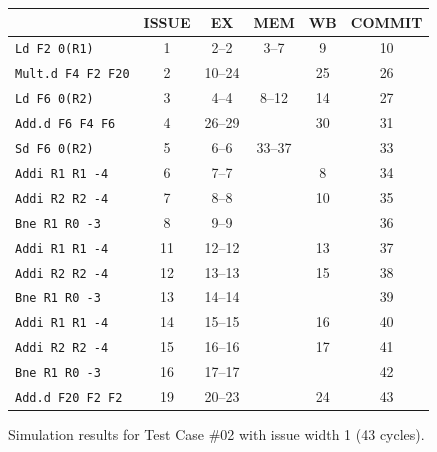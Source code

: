 \documentclass[11pt]{article}
\renewcommand{\_}{\origunderscore\allowbreak}
\begin{document}
\begin{figure}[H]
\centering
\small
\begin{tabular}{lccccc}
\hline
 & ISSUE & EX & MEM & WB & COMMIT \\
\hline
\texttt{Ld F2 0(R1)} & 1 & 2--2 & 3--7 & 9 & 10 \\
\texttt{Mult.d F4 F2 F20} & 2 & 10--24 &  & 25 & 26 \\
\texttt{Ld F6 0(R2)} & 3 & 4--4 & 8--12 & 14 & 27 \\
\texttt{Add.d F6 F4 F6} & 4 & 26--29 &  & 30 & 31 \\
\texttt{Sd F6 0(R2)} & 5 & 6--6 & 33--37 &  & 33 \\
\texttt{Addi R1 R1 -4} & 6 & 7--7 &  & 8 & 34 \\
\texttt{Addi R2 R2 -4} & 7 & 8--8 &  & 10 & 35 \\
\texttt{Bne R1 R0 -3} & 8 & 9--9 &  &  & 36 \\
\texttt{Addi R1 R1 -4} & 11 & 12--12 &  & 13 & 37 \\
\texttt{Addi R2 R2 -4} & 12 & 13--13 &  & 15 & 38 \\
\texttt{Bne R1 R0 -3} & 13 & 14--14 &  &  & 39 \\
\texttt{Addi R1 R1 -4} & 14 & 15--15 &  & 16 & 40 \\
\texttt{Addi R2 R2 -4} & 15 & 16--16 &  & 17 & 41 \\
\texttt{Bne R1 R0 -3} & 16 & 17--17 &  &  & 42 \\
\texttt{Add.d F20 F2 F2} & 19 & 20--23 &  & 24 & 43 \\
\hline
\end{tabular}
\caption{Simulation results for Test Case \#02 with issue width 1 (43 cycles).}
\end{figure}
\end{document}
